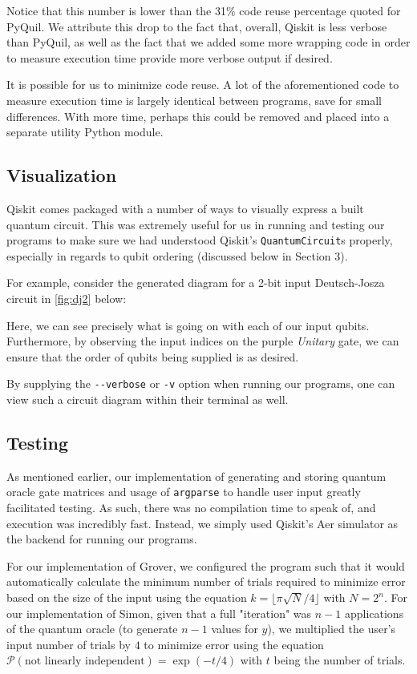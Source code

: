 \documentclass[12pt]{article}
\begin{document}
Notice that this number is lower than the 31\% code reuse percentage quoted for PyQuil.
We attribute this drop to the fact that, overall, Qiskit is less verbose than PyQuil, as well as the fact that we added some more wrapping code in order to measure execution time provide more verbose output if desired.

It is possible for us to minimize code reuse.
A lot of the aforementioned code to measure execution time is largely identical between programs, save for small differences.
With more time, perhaps this could be removed and placed into a separate utility Python module.

\subsection{Visualization}

Qiskit comes packaged with a number of ways to visually express a built quantum circuit.
This was extremely useful for us in running and testing our programs to make sure we had understood Qiskit's \texttt{QuantumCircuit}s properly, especially in regards to qubit ordering (discussed below in Section 3).

For example, consider the generated diagram for a 2-bit input Deutsch-Josza circuit in \autoref{fig:dj2} below:

Here, we can see precisely what is going on with each of our input qubits.
Furthermore, by observing the input indices on the purple \textit{Unitary} gate, we can ensure that the order of qubits being supplied is as desired.

By supplying the \texttt{-{}-verbose} or \texttt{-v} option when running our programs, one can view such a circuit diagram within their terminal as well.

\subsection{Testing}

As mentioned earlier, our implementation of generating and storing quantum oracle gate matrices and usage of \texttt{argparse} to handle user input greatly facilitated testing.
As such, there was no compilation time to speak of, and execution was incredibly fast.
Instead, we simply used Qiskit's Aer simulator as the backend for running our programs.

For our implementation of Grover, we configured the program such that it would automatically calculate the minimum number of trials required to minimize error based on the size of the input using the equation $k = \lfloor\pi\sqrt{N}/4\rfloor$ with $N = 2^n$. For our implementation of Simon, given that a full "iteration" was $n-1$ applications of the quantum oracle (to generate $n-1$ values for $y$), we multiplied the user's input number of trials by $4$ to minimize error using the equation $\mathcal{P}(\text{not linearly independent}) = \exp(-t/4)$ with $t$ being the number of trials.
\end{document}
